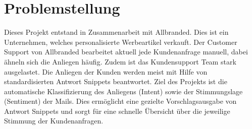 \chapter{Problemstellung}

Dieses Projekt entstand in Zusammenarbeit mit Allbranded. Dies ist ein Unternehmen, welches personalisierte Werbeartikel verkauft.
Der Customer Support von Allbranded bearbeitet aktuell jede Kundenanfrage manuell, dabei ähneln sich die Anliegen häufig. Zudem ist das Kundensupport Team stark ausgelastet. Die Anliegen der Kunden werden meist mit Hilfe von standardisierten Antwort Snippets beantwortet. 
Ziel des Projekts ist die automatische Klassifizierung des Anliegens (Intent) sowie der Stimmungslage (Sentiment) der Mails. Dies ermöglicht eine gezielte Vorschlagsausgabe von Antwort Snippets und sorgt für eine schnelle Übersicht über die jeweilige Stimmung der Kundenanfragen. 
